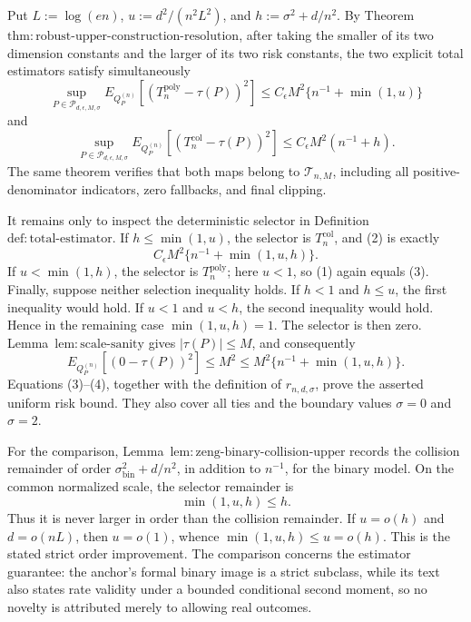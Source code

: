 Put \(L:=\log(en)\), \(u:=d^2/(n^2L^2)\), and \(h:=\sigma^2+d/n^2\).  By Theorem~\(\mathrm{thm:robust\text{-}upper\text{-}construction\text{-}resolution}\), after taking the smaller of its two dimension constants and the larger of its two risk constants, the two explicit total estimators satisfy simultaneously
\[
 \sup_{P\in\mathcal P_{d,\epsilon,M,\sigma}}
 E_{Q_P^{(n)}}[(T_n^{\mathrm{poly}}-\tau(P))^2]
 \le C_{\epsilon}M^2\{n^{-1}+\min(1,u)\}
\tag{1}
\]
and
\[
 \sup_{P\in\mathcal P_{d,\epsilon,M,\sigma}}
 E_{Q_P^{(n)}}[(T_n^{\mathrm{col}}-\tau(P))^2]
 \le C_{\epsilon}M^2(n^{-1}+h).
\tag{2}
\]
The same theorem verifies that both maps belong to \(\mathcal T_{n,M}\), including all positive-denominator indicators, zero fallbacks, and final clipping.

It remains only to inspect the deterministic selector in Definition~\(\mathrm{def:total\text{-}estimator}\).  If \(h\le\min(1,u)\), the selector is \(T_n^{\mathrm{col}}\), and (2) is exactly
\[
 C_{\epsilon}M^2\{n^{-1}+\min(1,u,h)\}.
\tag{3}
\]
If \(u<\min(1,h)\), the selector is \(T_n^{\mathrm{poly}}\); here \(u<1\), so (1) again equals (3).  Finally, suppose neither selection inequality holds.  If \(h<1\) and \(h\le u\), the first inequality would hold.  If \(u<1\) and \(u<h\), the second inequality would hold.  Hence in the remaining case \(\min(1,u,h)=1\).  The selector is then zero.  Lemma~\(\mathrm{lem:scale\text{-}sanity}\) gives \(|\tau(P)|\le M\), and consequently
\[
 E_{Q_P^{(n)}}[(0-\tau(P))^2]\le M^2
 \le M^2\{n^{-1}+\min(1,u,h)\}.
\tag{4}
\]
Equations (3)--(4), together with the definition of \(r_{n,d,\sigma}\), prove the asserted uniform risk bound.  They also cover all ties and the boundary values \(\sigma=0\) and \(\sigma=2\).

For the comparison, Lemma~\(\mathrm{lem:zeng\text{-}binary\text{-}collision\text{-}upper}\) records the collision remainder of order \(\sigma_{\mathrm{bin}}^2+d/n^2\), in addition to \(n^{-1}\), for the binary model.  On the common normalized scale, the selector remainder is
\[
 \min(1,u,h)\le h.
\tag{5}
\]
Thus it is never larger in order than the collision remainder.  If \(u=o(h)\) and \(d=o(nL)\), then \(u=o(1)\), whence \(\min(1,u,h)\le u=o(h)\).  This is the stated strict order improvement.  The comparison concerns the estimator guarantee: the anchor's formal binary image is a strict subclass, while its text also states rate validity under a bounded conditional second moment, so no novelty is attributed merely to allowing real outcomes.